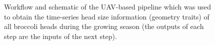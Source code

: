 \begin{figure}[htb]
  \begin{center}
  \end{center}
  \caption[Workflow and schematic of the UAV-based pipeline]{
    Workflow and schematic of the UAV-based pipeline which was used to obtain the time-series head size information (geometry traits) of all broccoli heads during the growing season (the outputs of each step are the inputs of the next step).
  }
  \label{fig:bro4}
\end{figure}
